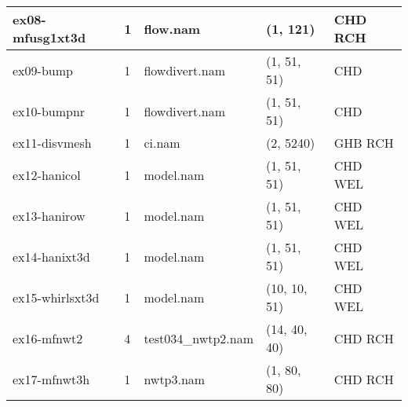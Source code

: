 \begin{longtable}{p{3cm} p{1cm} p{3cm} p{2.5cm}p{4cm}}
\hline
ex08-mfusg1xt3d & 1 & \parbox[t]{3cm}{ flow.nam \\}& \parbox[t]{3cm}{ (1, 121) \\}& \parbox[t]{4cm}{ CHD RCH  \\}\\
\hline
ex09-bump & 1 & \parbox[t]{3cm}{ flowdivert.nam \\}& \parbox[t]{3cm}{ (1, 51, 51) \\}& \parbox[t]{4cm}{ CHD  \\}\\
\hline
ex10-bumpnr & 1 & \parbox[t]{3cm}{ flowdivert.nam \\}& \parbox[t]{3cm}{ (1, 51, 51) \\}& \parbox[t]{4cm}{ CHD  \\}\\
\hline
ex11-disvmesh & 1 & \parbox[t]{3cm}{ ci.nam \\}& \parbox[t]{3cm}{ (2, 5240) \\}& \parbox[t]{4cm}{ GHB RCH  \\}\\
\hline
ex12-hanicol & 1 & \parbox[t]{3cm}{ model.nam \\}& \parbox[t]{3cm}{ (1, 51, 51) \\}& \parbox[t]{4cm}{ CHD WEL  \\}\\
\hline
ex13-hanirow & 1 & \parbox[t]{3cm}{ model.nam \\}& \parbox[t]{3cm}{ (1, 51, 51) \\}& \parbox[t]{4cm}{ CHD WEL  \\}\\
\hline
ex14-hanixt3d & 1 & \parbox[t]{3cm}{ model.nam \\}& \parbox[t]{3cm}{ (1, 51, 51) \\}& \parbox[t]{4cm}{ CHD WEL  \\}\\
\hline
ex15-whirlsxt3d & 1 & \parbox[t]{3cm}{ model.nam \\}& \parbox[t]{3cm}{ (10, 10, 51) \\}& \parbox[t]{4cm}{ CHD WEL  \\}\\
\hline
ex16-mfnwt2 & 4 & \parbox[t]{3cm}{ test034\_nwtp2.nam \\}& \parbox[t]{3cm}{ (14, 40, 40) \\}& \parbox[t]{4cm}{ CHD RCH  \\}\\
\hline
ex17-mfnwt3h & 1 & \parbox[t]{3cm}{ nwtp3.nam \\}& \parbox[t]{3cm}{ (1, 80, 80) \\}& \parbox[t]{4cm}{ CHD RCH  \\}\\

\end{longtable}
